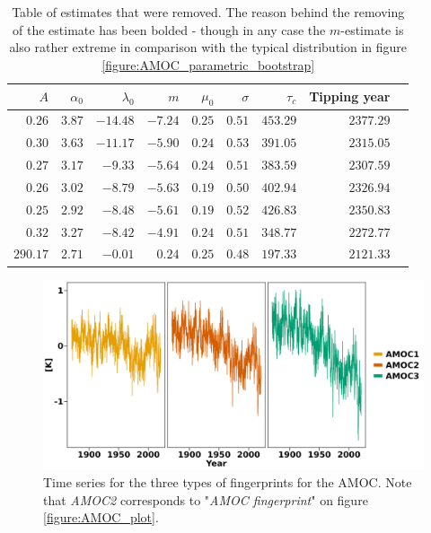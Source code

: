     \begin{table}[ht]
        \centering
        \begin{tabular}{rrrrrrrrr}
            \hline
            $A$ & $\alpha_0$ & $\lambda_0$ & $m$ & $\mu_0$ & $\sigma$ & $\tau_c$ & Tipping year \\ 
            \hline
            $0.26$ & $3.87$ & $\mathbf{-14.48}$ & $-7.24$ & $0.25$ & $0.51$ & $453.29$ & $2377.29$ \\ 
            $0.30$ & $3.63$ & $\mathbf{-11.17}$ & $-5.90$ & $0.24$ & $0.53$ & $391.05$ & $2315.05$ \\ 
            $0.27$ & $3.17$ & $\mathbf{-9.33}$ & $-5.64$ & $0.24$ & $0.51$ & $383.59$ & $2307.59$ \\ 
            $0.26$ & $3.02$ & $\mathbf{-8.79}$ & $-5.63$ & $0.19$ & $0.50$ & $402.94$ & $2326.94$ \\ 
            $0.25$ & $2.92$ & $\mathbf{-8.48}$ & $-5.61$ & $0.19$ & $0.52$ & $426.83$ & $2350.83$ \\ 
            $0.32$ & $3.27$ & $\mathbf{-8.42}$ & $-4.91$ & $0.24$ & $0.51$ & $348.77$ & $2272.77$ \\ 
            $\mathbf{290.17}$ & $2.71$ & $-0.01$ & $0.24$& $0.25$ & $0.48$ & $197.33$ & $2121.33$ \\ 
             \hline
        \end{tabular}
        \caption{Table of estimates that were removed. The reason behind the removing of the estimate has been bolded - though in any case the $m$-estimate is also rather extreme in comparison with the typical distribution in figure \ref{figure:AMOC_parametric_bootstrap}}
        \label{table:extreme_amoc_estimates}
    \end{table}
    \begin{figure}[h!]
        \begin{center}
            \includegraphics[scale = .1]{figures/AMOC_alt_plot.jpeg}
            \caption{Time series for the three types of fingerprints for the AMOC. Note that \textit{AMOC2} corresponds to "\textit{AMOC fingerprint}" on figure \ref{figure:AMOC_plot}.}
            \label{figure:allAMOCFingerprints}
        \end{center}
    \end{figure}
\newpage
